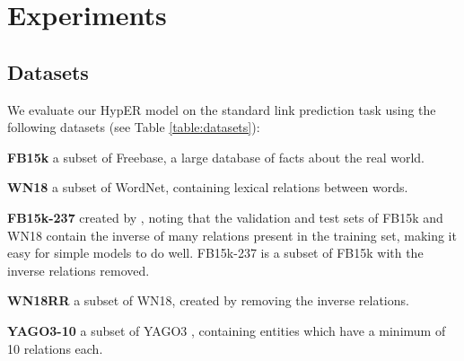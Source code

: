 \documentclass[runningheads]{llncs}
\newcommand{\keypoint}[1]{\vspace{0.1cm}\noindent\textbf{#1}\quad}
\begin{document}
\section{Experiments}

\subsection{Datasets}

We evaluate our HypER model on the standard link prediction task using the following datasets (see Table \ref{table:datasets}):

\keypoint{FB15k}  \cite{bordes2013translating} a subset of Freebase, a large database of facts about the real world.

\keypoint{WN18}  \cite{bordes2013translating} a subset of WordNet, containing lexical relations between words.

\keypoint{FB15k-237} created by \cite{toutanova2015representing}, noting that the validation and test sets of FB15k and WN18 contain the inverse of many relations present in the training set, making it easy for simple models to do well. FB15k-237 is a subset of FB15k with the inverse relations removed.

\keypoint{WN18RR} \cite{dettmers2017convolutional} a subset of WN18, created by removing the inverse relations. 

\keypoint{YAGO3-10} \cite{dettmers2017convolutional} a subset of YAGO3 \cite{mahdisoltani2013yago3}, containing entities which have a minimum of 10 relations each. 
\vspace{-0.5cm}
\begin{table}[!htp]
	\centering
	\caption{Summary of dataset statistics.}
     \label{table:datasets}
 \end{table}

\vspace{-1cm}
\end{document}
